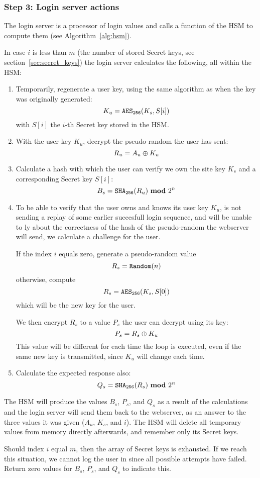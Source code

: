 \subsubsection{Step 3: Login server actions}
\label{sec:login_step3}
The login server is a processor of login values and calls a function of the HSM to compute them
(see Algorithm~\vref{alg:hsm}).
\par
In case $i$ is less than $m$
(the number of stored Secret keys, see section~\vref{sec:secret_keys})
the login server calculates the following, all within the HSM:
\begin{enumerate}
\item Temporarily, regenerate a user key, using the same algorithm as when the key was originally generated:
\[K_u=\texttt{\ensuremath{\mathtt{AES_{256}}}}(K_s,S[i])\]
with $S[i]$ the $i$-th Secret key stored in the HSM.
\item With the user key $K_u$, decrypt the pseudo-random the user has sent:
\[R_u=A_u\oplus K_u\]
\item Calculate a hash with which the user can verify we own the site key $K_s$ and a corresponding Secret key $S[i]$:
\[B_s=\texttt{\ensuremath{\mathtt{SHA_{256}}}}(R_u)\ \textbf{mod}\ 2^{n}\]
\item To be able to verify that the user owns and knows its user key $K_u$,
is not sending a replay of some earlier succesfull login sequence,
and will be unable to ly about the correctness of the hash of the pseudo-random the webserver will send,
we calculate a challenge for the user.
\par
If the index $i$ equals zero, generate a pseudo-random value
\[R_s=\texttt{Random}(n)\]
otherwise, compute
\[R_s=\texttt{\ensuremath{\mathtt{AES_{256}}}}(K_s,S[0])\]
which will be the new key for the user.
\par
We then encrypt $R_s$ to a value $P_s$ the user can decrypt using its key:
\[P_s=R_s\oplus K_u\]
This value will be different for each time the loop is executed,
even if the same new key is transmitted,
since $K_u$ will change each time.
\item Calculate the expected response also:
\[Q_s=\texttt{\ensuremath{\mathtt{SHA_{256}}}}(R_s)\ \textbf{mod}\ 2^{n}\]
\end{enumerate}
The HSM will produce the values $B_s$,
$P_s$,
and $Q_s$ as a result of the calculations and the login server will send them back to the webserver,
as an answer to the three values it was given ($A_u$, $K_s$, and $i$).
The HSM will delete all temporary values from memory directly afterwards, and remember only its Secret keys.
\par
Should index $i$ equal $m$, then the array of Secret keys is exhausted.
If we reach this situation, we cannot log the user in since all possible attempts have failed.
Return zero values for $B_s$, $P_s$, and $Q_s$ to indicate this.

